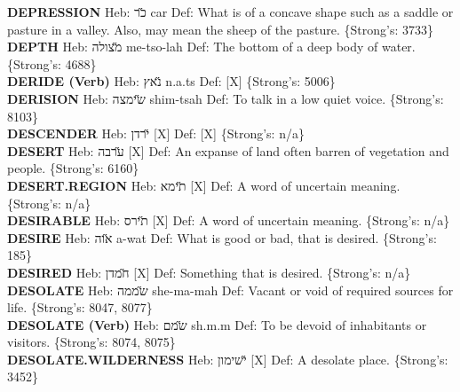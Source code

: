 {\textbf{DEPRESSION} Heb: {\large\H כר} car Def: What is of a concave shape such as a saddle or pasture in a valley. Also, may mean the sheep of the pasture. \{Strong's: 3733\}\hfill{}\\

\textbf{DEPTH} Heb: {\large\H מצולה} me-tso-lah Def: The bottom of a deep body of water. \{Strong's: 4688\}\hfill{}\\

\textbf{DERIDE (Verb)} Heb: {\large\H נאץ} n.a.ts Def: {[}X{]} \{Strong's: 5006\}\hfill{}\\

\textbf{DERISION} Heb: {\large\H שימצה} shim-tsah Def: To talk in a low quiet voice. \{Strong's: 8103\}\hfill{}\\

\textbf{DESCENDER} Heb: {\large\H ירדן} {[}X{]} Def: {[}X{]} \{Strong's: n/a\}\hfill{}\\

\textbf{DESERT} Heb: {\large\H ערבה} {[}X{]} Def: An expanse of land often barren of vegetation and people. \{Strong's: 6160\}\hfill{}\\

\textbf{DESERT.REGION} Heb: {\large\H תימא} {[}X{]} Def: A word of uncertain meaning. \{Strong's: n/a\}\hfill{}\\

\textbf{DESIRABLE} Heb: {\large\H תירס} {[}X{]} Def: A word of uncertain meaning. \{Strong's: n/a\}\hfill{}\\

\textbf{DESIRE} Heb: {\large\H אוה} a-wat Def: What is good or bad, that is desired. \{Strong's: 185\}\hfill{}\\

\textbf{DESIRED} Heb: {\large\H חמדן} {[}X{]} Def: Something that is desired. \{Strong's: n/a\}\hfill{}\\

\textbf{DESOLATE} Heb: {\large\H שממה} she-ma-mah Def: Vacant or void of required sources for life. \{Strong's: 8047, 8077\}\hfill{}\\

\textbf{DESOLATE (Verb)} Heb: {\large\H שמם} sh.m.m Def: To be devoid of inhabitants or visitors. \{Strong's: 8074, 8075\}\hfill{}\\

\textbf{DESOLATE.WILDERNESS} Heb: {\large\H ישימון} {[}X{]} Def: A desolate place. \{Strong's: 3452\}\hfill{}\\

}
